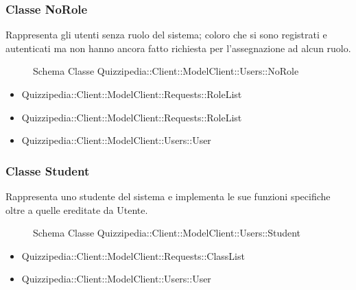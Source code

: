 \subsubsection{Classe NoRole}
Rappresenta gli utenti senza ruolo del sistema; coloro che si sono registrati e autenticati ma non hanno ancora fatto richiesta per l'assegnazione ad alcun ruolo.
\begin{figure}[H]
\centering
\noindent{}
\caption[Schema Classe NoRole]{Schema Classe Quizzipedia::Client::ModelClient::Users::NoRole}
\end{figure}
\begin{itemize}
\item Quizzipedia::Client::ModelClient::Requests::RoleList
\end{itemize}
\begin{itemize}
\item Quizzipedia::Client::ModelClient::Requests::RoleList
\item Quizzipedia::Client::ModelClient::Users::User
\end{itemize}
\subsubsection{Classe Student}
Rappresenta uno studente del sistema e implementa le sue funzioni specifiche oltre a quelle ereditate da Utente.
\begin{figure}[H]
\centering
\noindent{}
\caption[Schema Classe Student]{Schema Classe Quizzipedia::Client::ModelClient::Users::Student}
\end{figure}
\begin{itemize}
\item Quizzipedia::Client::ModelClient::Requests::ClassList
\item Quizzipedia::Client::ModelClient::Users::User
\end{itemize}
